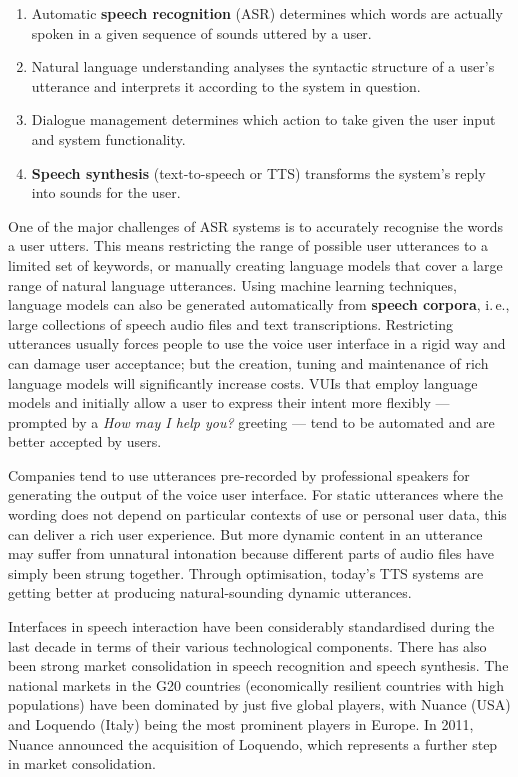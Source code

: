 \begin{multicols}{2}
\begin{enumerate}
\item Automatic \textbf{speech recognition} (ASR) determines which words are actually spoken in a given sequence of sounds uttered by a user.
\item Natural language understanding analyses the syntactic structure of a user’s utterance and interprets it according to the system in question.
\item Dialogue management determines which action to take given the user input and system functionality.
\item \textbf{Speech synthesis} (text-to-speech or TTS) transforms the system’s reply into sounds for the user.
\end{enumerate}

One of the major challenges of ASR systems is to accurately recognise the words a user utters. This means restricting the range of possible user utterances to a limited set of keywords, or manually creating language models that cover a large range of natural language utterances. Using machine learning techniques, language models can also be generated automatically from \textbf{speech corpora}, i.\,e., large collections of speech audio files and text transcriptions. Restricting utterances usually forces people to use the voice user interface in a rigid way and can damage user acceptance; but the creation, tuning and maintenance of rich language models will significantly increase costs. VUIs that employ language models and initially allow a user to express their intent more flexibly — prompted by a \textit{How may I help you?} greeting — tend to be automated and are better accepted by users.


Companies tend to use utterances pre-recorded by professional speakers for generating the output of the voice user interface. For static utterances where the wording does not depend on particular contexts of use or personal user data, this can deliver a rich user experience. But more dynamic content in an utterance may suffer from unnatural intonation because different parts of audio files have simply been strung together. Through optimisation, today’s TTS systems are getting better at producing natural-sounding dynamic utterances.

Interfaces in speech interaction have been considerably standardised during the last decade in terms of their various technological components. There has also been strong market consolidation in speech recognition and speech synthesis. The national markets in the G20 countries (economically resilient countries with high populations) have been dominated by just five global players, with Nuance (USA) and Loquendo (Italy) being the most prominent players in Europe. In 2011, Nuance announced the acquisition of Loquendo, which represents a further step in market consolidation.


\end{multicols}

